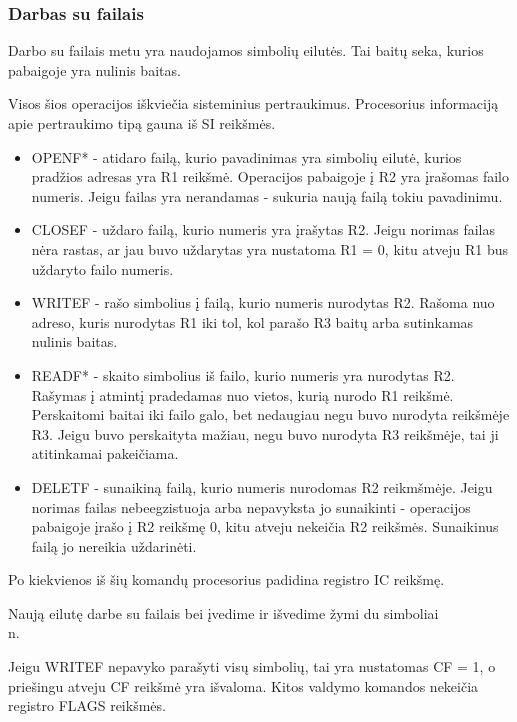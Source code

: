 \documentclass{VUMIFInfKursinis}
\begin{document}
\subsubsection{Darbas su failais}
Darbo su failais metu yra naudojamos simbolių eilutės. Tai baitų seka, kurios pabaigoje yra nulinis baitas.

Visos šios operacijos iškviečia sisteminius pertraukimus. Procesorius informaciją apie pertraukimo tipą gauna iš SI reikšmės.
\begin{itemize}
	\item OPENF* - atidaro failą, kurio pavadinimas yra simbolių eilutė, kurios pradžios adresas yra R1 reikšmė. Operacijos pabaigoje į R2 yra įrašomas failo numeris. Jeigu failas yra nerandamas - sukuria naują failą tokiu pavadinimu.
	\item CLOSEF - uždaro failą, kurio numeris yra įrašytas  R2. Jeigu norimas failas nėra rastas, ar jau buvo uždarytas yra nustatoma R1 = 0, kitu atveju R1 bus uždaryto failo numeris.
	\item WRITEF - rašo simbolius į failą, kurio numeris nurodytas R2. Rašoma nuo adreso, kuris nurodytas R1 iki tol, kol parašo R3 baitų arba sutinkamas nulinis baitas.
	\item READF* - skaito simbolius iš failo, kurio numeris yra nurodytas R2. Rašymas į atmintį pradedamas nuo vietos, kurią nurodo R1 reikšmė. Perskaitomi baitai iki failo galo, bet nedaugiau negu buvo nurodyta reikšmėje R3. Jeigu buvo perskaityta mažiau, negu buvo nurodyta R3 reikšmėje, tai ji atitinkamai pakeičiama.
	\item DELETF - sunaikiną failą, kurio numeris nurodomas R2 reikmšmėje. Jeigu norimas failas nebeegzistuoja arba nepavyksta jo sunaikinti - operacijos pabaigoje įrašo į R2 reikšmę 0, kitu atveju nekeičia R2 reikšmės. Sunaikinus failą jo nereikia uždarinėti.
\end{itemize}

Po kiekvienos iš šių komandų procesorius padidina registro IC reikšmę.

Naują eilutę darbe su failais bei įvedime ir išvedime žymi du simboliai \\n.

Jeigu WRITEF nepavyko parašyti visų simbolių, tai yra nustatomas CF = 1, o priešingu atveju CF reikšmė yra išvaloma. Kitos valdymo komandos nekeičia registro FLAGS reikšmės.
\end{document}
